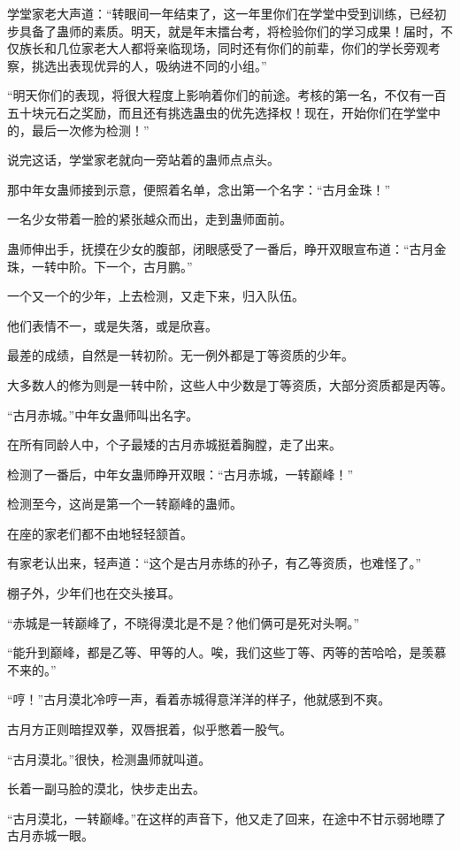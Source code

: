 \begin{this_body}
学堂家老大声道：“转眼间一年结束了，这一年里你们在学堂中受到训练，已经初步具备了蛊师的素质。明天，就是年末擂台考，将检验你们的学习成果！届时，不仅族长和几位家老大人都将亲临现场，同时还有你们的前辈，你们的学长旁观考察，挑选出表现优异的人，吸纳进不同的小组。”

“明天你们的表现，将很大程度上影响着你们的前途。考核的第一名，不仅有一百五十块元石之奖励，而且还有挑选蛊虫的优先选择权！现在，开始你们在学堂中的，最后一次修为检测！”

说完这话，学堂家老就向一旁站着的蛊师点点头。

那中年女蛊师接到示意，便照着名单，念出第一个名字：“古月金珠！”

一名少女带着一脸的紧张越众而出，走到蛊师面前。

蛊师伸出手，抚摸在少女的腹部，闭眼感受了一番后，睁开双眼宣布道：“古月金珠，一转中阶。下一个，古月鹏。”

一个又一个的少年，上去检测，又走下来，归入队伍。

他们表情不一，或是失落，或是欣喜。

最差的成绩，自然是一转初阶。无一例外都是丁等资质的少年。

大多数人的修为则是一转中阶，这些人中少数是丁等资质，大部分资质都是丙等。

“古月赤城。”中年女蛊师叫出名字。

在所有同龄人中，个子最矮的古月赤城挺着胸膛，走了出来。

检测了一番后，中年女蛊师睁开双眼：“古月赤城，一转巅峰！”

检测至今，这尚是第一个一转巅峰的蛊师。

在座的家老们都不由地轻轻颔首。

有家老认出来，轻声道：“这个是古月赤练的孙子，有乙等资质，也难怪了。”

棚子外，少年们也在交头接耳。

“赤城是一转巅峰了，不晓得漠北是不是？他们俩可是死对头啊。”

“能升到巅峰，都是乙等、甲等的人。唉，我们这些丁等、丙等的苦哈哈，是羡慕不来的。”

“哼！”古月漠北冷哼一声，看着赤城得意洋洋的样子，他就感到不爽。

古月方正则暗捏双拳，双唇抿着，似乎憋着一股气。

“古月漠北。”很快，检测蛊师就叫道。

长着一副马脸的漠北，快步走出去。

“古月漠北，一转巅峰。”在这样的声音下，他又走了回来，在途中不甘示弱地瞟了古月赤城一眼。


\end{this_body}
